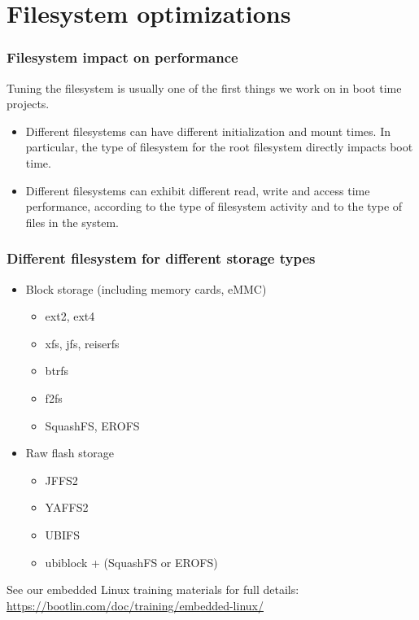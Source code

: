 \section{Filesystem optimizations}

\begin{frame}
\frametitle{Filesystem impact on performance}
Tuning the filesystem is usually one of the first things
we work on in boot time projects.
\begin{itemize}
\item Different filesystems can have different initialization
      and mount times. In particular, the type of filesystem
      for the root filesystem directly impacts boot time.
\item Different filesystems can exhibit different read, write
      and access time performance, according to the type
      of filesystem activity and to the type of files in the
      system.
\end{itemize}
\end{frame}

\begin{frame}
\frametitle{Different filesystem for different storage types}
\begin{itemize}
\item Block storage (including memory cards, eMMC)
      \begin{itemize}
      \item ext2, ext4
      \item xfs, jfs, reiserfs
      \item btrfs
      \item f2fs
      \item SquashFS, EROFS
      \end{itemize}
\item Raw flash storage
      \begin{itemize}
      \item JFFS2
      \item YAFFS2
      \item UBIFS
      \item ubiblock + (SquashFS or EROFS)
      \end{itemize}
\end{itemize}
See our embedded Linux training materials for full details:
{\small
\url{https://bootlin.com/doc/training/embedded-linux/}
}
\end{frame}

